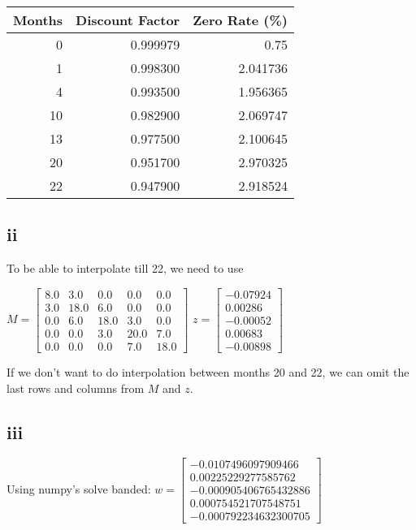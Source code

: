 \documentclass{article}
\begin{document}
\begin{tabular}{rrr}
    \toprule
    Months & Discount Factor & Zero Rate (\%) \\
    \midrule
    0      & 0.999979        & 0.75           \\
    1      & 0.998300        & 2.041736       \\
    4      & 0.993500        & 1.956365       \\
    10     & 0.982900        & 2.069747       \\
    13     & 0.977500        & 2.100645       \\
    20     & 0.951700        & 2.970325       \\
    22     & 0.947900        & 2.918524       \\
    \bottomrule
\end{tabular}
\subsection*{ii}
To be able to interpolate till 22, we need to use

$M = \displaystyle \left[\begin{matrix}8.0 & 3.0 & 0.0 & 0.0 & 0.0\\3.0 & 18.0 & 6.0 & 0.0 & 0.0\\0.0 & 6.0 & 18.0 & 3.0 & 0.0\\0.0 & 0.0 & 3.0 & 20.0 & 7.0\\0.0 & 0.0 & 0.0 & 7.0 & 18.0\end{matrix}\right]$
$z = \displaystyle \left[\begin{matrix}-0.07924\\0.00286\\-0.00052\\0.00683\\-0.00898\end{matrix}\right]$

If we don't want to do interpolation between months 20 and 22, we can omit the last rows and columns from $M$ and $z$.
\subsection*{iii}
Using numpy's solve banded:
$w = \displaystyle \left[\begin{matrix}-0.0107496097909466\\0.00225229277585762\\-0.000905406765432886\\0.000754521707548751\\-0.000792234632300705\end{matrix}\right]$
\end{document}

